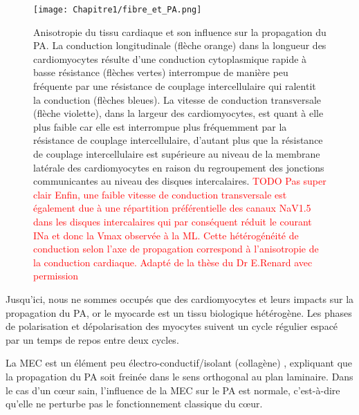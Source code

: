 \begin{figure}[!htbp]
  \begin{center}
    \texttt{[image: Chapitre1/fibre\_et\_PA.png]}
  \end{center}
  \caption{Anisotropie du tissu cardiaque et son influence sur la propagation du PA. La conduction longitudinale (flèche orange) dans la longueur des cardiomyocytes résulte d’une conduction cytoplasmique rapide à basse résistance (flèches vertes) interrompue de manière peu fréquente par une résistance de couplage intercellulaire qui ralentit la conduction (flèches bleues). La vitesse de conduction transversale (flèche violette), dans la largeur des cardiomyocytes, est quant à elle plus faible car elle est interrompue plus fréquemment par la résistance de couplage intercellulaire, d’autant plus que la résistance de couplage intercellulaire est supérieure au niveau de la membrane latérale des cardiomyocytes en raison du regroupement des jonctions communicantes au niveau des disques intercalaires. \textcolor{red}{TODO Pas super clair Enfin, une faible vitesse de conduction transversale est également due à une répartition préférentielle des canaux NaV1.5 dans les disques intercalaires qui par conséquent réduit le courant INa et donc la Vmax observée à la ML. Cette hétérogénéité de conduction selon l’axe de propagation correspond à l’anisotropie de la conduction cardiaque. Adapté de la thèse du Dr E.Renard avec permission} \cite{renard:tel-04344684}}
  \label{fig:fig_fibre_et_PA}
\end{figure}

\clearpage

Jusqu’ici, nous ne sommes occupés que des cardiomyocytes et leurs impacts sur la propagation du PA, or le myocarde est un tissu biologique hétérogène. Les phases de polarisation et dépolarisation des myocytes suivent un cycle régulier espacé par un temps de repos entre deux cycles.

La MEC est un élément peu électro-conductif/isolant (collagène) \cite{Zannad2005}, expliquant que la propagation du PA soit freinée dans le sens orthogonal au plan laminaire. Dans le cas d’un cœur sain, l’influence de la MEC sur le PA est normale, c’est-à-dire qu’elle ne perturbe pas le fonctionnement classique du cœur.

